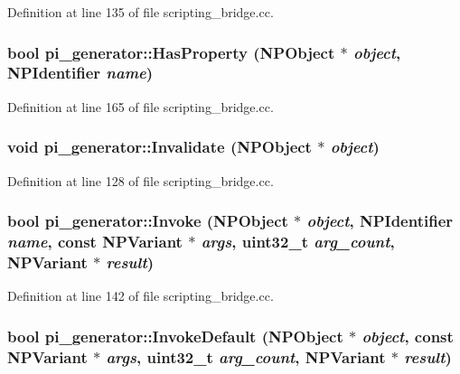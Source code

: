 Definition at line 135 of file scripting\_\-bridge.cc.

\hypertarget{namespacepi__generator_a87a1eff2d42a1e673e616057680369b7}{
\subsubsection[{HasProperty}]{\setlength{\rightskip}{0pt plus 5cm}bool pi\_\-generator::HasProperty (NPObject $\ast$ {\em object}, \/  NPIdentifier {\em name})}}
\label{namespacepi__generator_a87a1eff2d42a1e673e616057680369b7}


Definition at line 165 of file scripting\_\-bridge.cc.

\hypertarget{namespacepi__generator_a733df66e71ec7f2dba460c638180aa0e}{
\subsubsection[{Invalidate}]{\setlength{\rightskip}{0pt plus 5cm}void pi\_\-generator::Invalidate (NPObject $\ast$ {\em object})}}
\label{namespacepi__generator_a733df66e71ec7f2dba460c638180aa0e}


Definition at line 128 of file scripting\_\-bridge.cc.

\hypertarget{namespacepi__generator_a861f69824d0671573232af470d07c0fa}{
\subsubsection[{Invoke}]{\setlength{\rightskip}{0pt plus 5cm}bool pi\_\-generator::Invoke (NPObject $\ast$ {\em object}, \/  NPIdentifier {\em name}, \/  const NPVariant $\ast$ {\em args}, \/  uint32\_\-t {\em arg\_\-count}, \/  NPVariant $\ast$ {\em result})}}
\label{namespacepi__generator_a861f69824d0671573232af470d07c0fa}


Definition at line 142 of file scripting\_\-bridge.cc.

\hypertarget{namespacepi__generator_a7fab356f3ceba853332861bcc927c54f}{
\subsubsection[{InvokeDefault}]{\setlength{\rightskip}{0pt plus 5cm}bool pi\_\-generator::InvokeDefault (NPObject $\ast$ {\em object}, \/  const NPVariant $\ast$ {\em args}, \/  uint32\_\-t {\em arg\_\-count}, \/  NPVariant $\ast$ {\em result})}}
\label{namespacepi__generator_a7fab356f3ceba853332861bcc927c54f}


